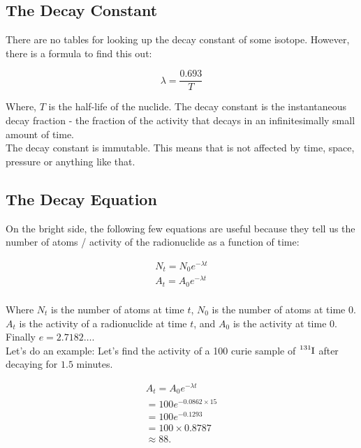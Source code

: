 \documentclass{article}
\begin{document}
\begin{multicols*}{2}
    \subsection{The Decay Constant}
    There are no tables for looking up the decay constant of some isotope.
    However, there is a formula to find this out:

    \[
      \lambda = \frac{0.693}{T}
    \]

    Where, $T$ is the half-life of the nuclide. The decay constant is the
    instantaneous decay fraction - the fraction of the activity that decays
    in an infinitesimally small amount of time.\\

    The decay constant is immutable. This means that is not affected by time,
    space, pressure or anything like that.
    
    \subsection{The Decay Equation}
    On the bright side, the following few equations are useful because
    they tell us the number of atoms / activity of the radionuclide as
    a function of time:

    \begin{equation*}
      \begin{split}
        N_t = N_{0}e^{-\lambda{t}} \\
        A_t = A_{0}e^{-\lambda{t}} \\
      \end{split}
    \end{equation*}

    Where $N_t$ is the number of atoms at time $t$, $N_0$ is the number
    of atoms at time $0$. $A_t$ is the activity of a radionuclide at time $t$,
    and $A_0$ is the activity at time $0$. Finally $e = 2.7182\ldots$.\\

    Let's do an example: Let's find the activity of a 100 curie sample of
    $\ce{^{131}I}$ after decaying for $1.5$ minutes.

    \begin{equation*}
      \begin{split}
        A_t = A_{0}e^{-\lambda{t}} \\
        = 100e^{-0.0862 \times 15} \\
        = 100e^{-0.1293} \\
        = 100 \times 0.8787 \\
        \approx 88.
      \end{split}
    \end{equation*}


\end{multicols*}
\end{document}
